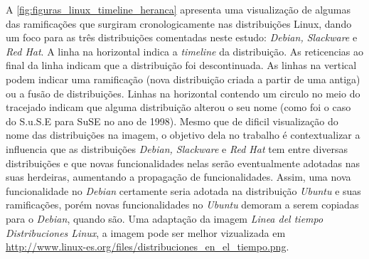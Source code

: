 \begin{anexosenv}
A \autoref{fig:figuras_linux_timeline_heranca} apresenta uma  visualização de algumas das ramificações que surgiram cronologicamente nas distribuições Linux, dando um foco para  as três distribuições comentadas neste estudo: \textit{Debian, Slackware} e \textit{Red Hat}. A linha na horizontal indica a \textit{timeline} da distribuição. As reticencias ao final da linha indicam que a distribuição foi descontinuada. As linhas na vertical podem indicar uma ramificação (nova distribuição criada a partir de uma antiga) ou a fusão de distribuições. Linhas na horizontal contendo um circulo no meio do tracejado indicam que alguma distribuição alterou o seu  nome (como foi o caso do S.u.S.E para SuSE no ano de 1998). Mesmo que de dificil visualização do nome das distribuições na imagem, o objetivo dela no trabalho é contextualizar a influencia que as distribuições \textit{Debian, Slackware} e \textit{Red Hat} tem entre diversas distribuições e que novas funcionalidades nelas serão eventualmente adotadas nas suas herdeiras, aumentando a propagação de funcionalidades. Assim, uma nova funcionalidade no \textit{Debian} certamente seria adotada na distribuição \textit{Ubuntu} e suas ramificações, porém novas funcionalidades no \textit{Ubuntu} demoram a serem copiadas para o \textit{Debian}, quando são. Uma adaptação da imagem \textit{Linea del tiempo Distribuciones Linux}, a imagem pode ser melhor vizualizada em \url{http://www.linux-es.org/files/distribuciones_en_el_tiempo.png}.


\end{anexosenv}

